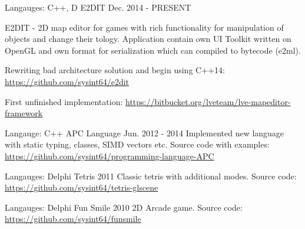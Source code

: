 \begin{cventries}
\cventry
{Langauges: C++, D} %
{E2DIT} %
{} %
{Dec. 2014 - PRESENT} %
{ %
E2DIT - 2D map editor for games with rich functionality for manipulation of objects and change their tology. \linebreak
Application contain own UI Toolkit written on OpenGL and own format for serialization which can compiled to bytecode (e2ml). \linebreak
\linebreak
\begin{cvitems}
    \item {Rewriting bad architecture solution and begin using C++14: \url{https://github.com/sysint64/e2dit}}
    \item {First unfinished implementation: \url{https://bitbucket.org/lveteam/lve-mapeditor-framework}}
\end{cvitems}
}

\cventry
{Langauge: C++} %
{APC Language} %
{} %
{Jun. 2012 - 2014} %
{ %
Implemented new language with static typing, classes, SIMD vectors etc. \linebreak
Source code with examples: \url{https://github.com/sysint64/programming-language-APC}
}


\cventry
{Langauges: Delphi} %
{Tetris} %
{} %
{2011} %
{ %
Classic tetris with additional modes. Source code: \url{https://github.com/sysint64/tetris-glscene}
}

\cventry
{Langauges: Delphi} %
{Fun Smile} %
{} %
{2010} %
{ %
2D Arcade game. Source code: \url{https://github.com/sysint64/funsmile}
}


\end{cventries}
